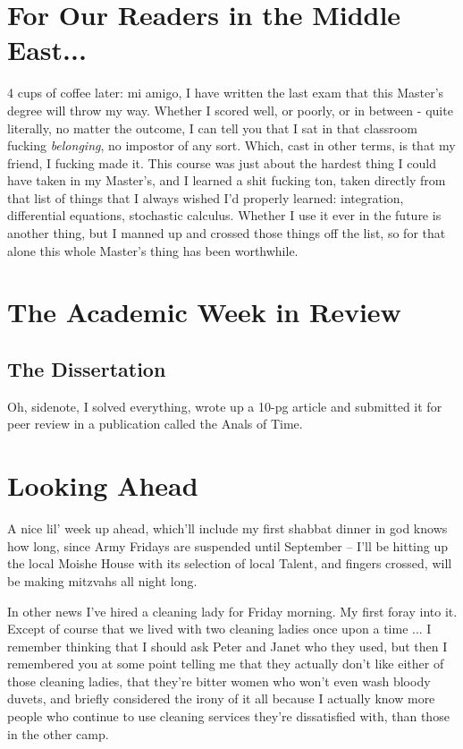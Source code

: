 \documentclass[12pt]{article}
\begin{document}
\newpage

\section*{For Our Readers in the Middle East...}
4 cups of coffee later: mi amigo, I have written the last exam that this Master's degree will throw my way. Whether I scored well, or poorly, or in between - quite literally, no matter the outcome, I can tell you that I sat in that classroom fucking \textit{belonging}, no impostor of any sort. Which, cast in other terms, is that my friend, I fucking made it. This course was just about the hardest thing I could have taken in my Master's, and I learned a shit fucking ton, taken directly from that list of things that I always wished I'd properly learned: integration, differential equations, stochastic calculus. Whether I use it ever in the future is another thing, but I manned up and crossed those things off the list, so for that alone this whole Master's thing has been worthwhile. 

\section*{The Academic Week in Review}
\subsection*{The Dissertation}
Oh, sidenote, I solved everything, wrote up a 10-pg article and submitted it for peer review in a publication called the Anals of Time.

\section*{Looking Ahead}
A nice lil' week up ahead, which'll include my first shabbat dinner in god knows how long, since Army Fridays are suspended until September -- I'll be hitting up the local Moishe House with its selection of local Talent, and fingers crossed, will be making mitzvahs all night long.

In other news I've hired a cleaning lady for Friday morning. My first foray into it. Except of course that we lived with two cleaning ladies once upon a time ... I remember thinking that I should ask Peter and Janet who they used, but then I remembered you at some point telling me that they actually don't like either of those cleaning ladies, that they're bitter women who won't even wash bloody duvets, and briefly considered the irony of it all because I actually know more people who continue to use cleaning services they're dissatisfied with, than those in the other camp. 
\end{document}

